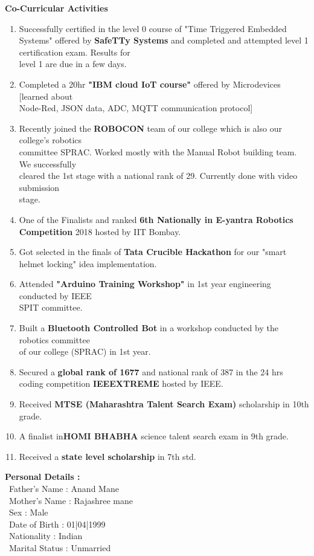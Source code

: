\documentclass[12pt]{article}
\begin{document}
\begin{flushleft}
\vspace{10mm}
\textbf{Co-Curricular Activities}
\begin{enumerate}
	\item Successfully certified in the level 0 course of "Time Triggered Embedded Systems" offered by \textbf{SafeTTy Systems} and completed and attempted level 1 certification exam. Results for\\ level 1 are due in a few days.  
	\item Completed a 20hr \textbf{"IBM cloud IoT course"} offered by Microdevices [learned about \\Node-Red, JSON data, ADC, MQTT communication protocol]
	\item Recently joined the \textbf{ROBOCON} team of our college which is also our college's robotics \\committee SPRAC. Worked mostly with the Manual Robot building team. We successfully\\ cleared the 1st stage with a national rank of 29. Currently done with video submission \\stage.
	\item One of the Finalists and ranked \textbf{6th Nationally in E-yantra Robotics Competition} 2018 hosted by IIT Bombay.  
	\item Got selected in the finals of \textbf{Tata Crucible Hackathon} for our "smart helmet locking" idea implementation.
	\item Attended \textbf{"Arduino Training Workshop"} in 1st year engineering conducted by IEEE \\SPIT committee.
	\item Built a \textbf{Bluetooth Controlled Bot} in a workshop conducted by the robotics committee \\of our college (SPRAC) in 1st year.
	\item Secured a \textbf{global rank of 1677} and national rank of 387 in the 24 hrs coding competition \textbf{IEEEXTREME} hosted by IEEE.
	\item Received \textbf{MTSE (Maharashtra Talent Search Exam)} scholarship in 10th grade.
	\item A finalist in\textbf{HOMI BHABHA} science talent search exam in 9th grade.
	\item Received a \textbf{state level scholarship} in 7th std.
		
\end{enumerate}

\vspace{10mm}
\textbf{Personal Details :}
\vspace{5mm}\\
\ Father's Name : Anand Mane\\
\ Mother's Name : Rajashree mane\\
\ Sex : Male\\
\ Date of Birth : 01|04|1999\\
\ Nationality : Indian\\
\ Marital Status : Unmarried \\
\end{flushleft}
\end{document}
